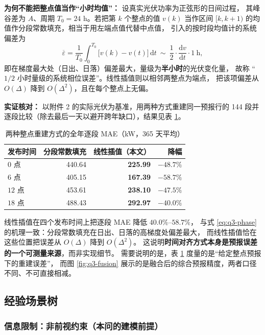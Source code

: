 \noindent\textbf{为何不能把整点值当作“小时均值”：} 设真实光伏功率为正弦形的日间过程，
其峰谷差为 $A$、周期 $T_0=24$ h。若把第 $k$ 个整点的值 $v(k)$ 当作区间
$[k,k+1)$ 的均值作分段常数填充，相当于用左端点值代替中点值，
引入的按时段均值计的系统偏差为
\begin{equation}
\overline{\varepsilon}=\frac{1}{T_0}\int_0^{T_0}\bigl[v(k)-v(t)\bigr]\,\mathrm{d}t\ \sim\ \frac{1}{2}\cdot\frac{\mathrm{d}v}{\mathrm{d}t}\cdot 1\ \text{h},
\label{eq:q3-phase}
\end{equation}
即在梯度最大处（日出、日落）偏差最大，量级为\textbf{半小时}的光伏变化量，
故称 “$1/2$ 小时量级的系统相位误差”。线性插值则以相邻两整点为端点，
把该项偏差从 $O(\Delta)$ 降到 $O(\Delta^2)$，且在每个整点上无偏。

\noindent\textbf{实证核对：} 以附件 2 的实际光伏为基准，用两种方式重建同一预报行的
144 段并逐段比较（除去最后一天以避开跨年缺口），结果见表 \ref{tab:q3-align}。

\begin{table}[H]
\centering
\caption{两种整点重建方式的全年逐段 MAE（kW，365 天平均）}
\label{tab:q3-align}
\begin{tabular}{@{}l r r r@{}}
\toprule
发布时间 & 分段常数填充 & \textbf{线性插值（本文）} & 降幅 \\
\midrule
$0$ 点  & 440.64 & \textbf{225.99} & $-48.7\%$ \\
$6$ 点  & 405.15 & \textbf{167.39} & $-58.7\%$ \\
$12$ 点 & 453.61 & \textbf{238.10} & $-47.5\%$ \\
$18$ 点 & 488.43 & \textbf{292.97} & $-40.0\%$ \\
\bottomrule
\end{tabular}
\end{table}

\noindent 线性插值在四个发布时间上把逐段 MAE 降低 $40.0\%$--$58.7\%$，
与式 \eqref{eq:q3-phase} 的机理一致：分段常数填充在日出、日落的高梯度处偏差最大，
而线性插值恰在这些位置把误差从 $O(\Delta)$ 降到 $O(\Delta^2)$。
这说明\textbf{时间对齐方式本身是预报误差的一个可测量来源}，而非实现细节。
需要说明的是，表 \ref{tab:q3-align} 度量的是“给定整点预报下的重建误差”，
而图 \ref{fig:q3-fusion} 展示的是融合后的综合预报精度，两者口径不同、不可直接相减。

\subsection{经验场景树}

\subsubsection{信息限制：非前视约束（本问的建模前提）}
\label{sec:q3-nonanticip}

